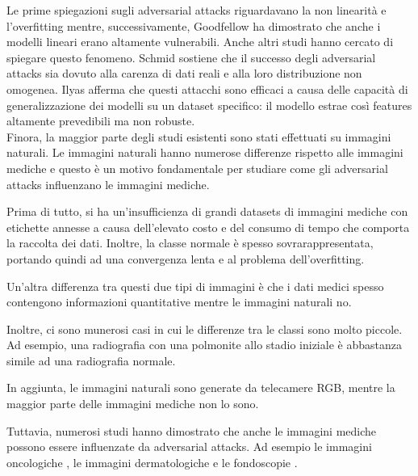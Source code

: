 Le prime spiegazioni sugli adversarial attacks riguardavano la non linearità e l'overfitting mentre, successivamente, Goodfellow %
\cite{goodfellow2014explaining} ha dimostrato che %
anche i modelli lineari erano altamente vulnerabili.
Anche altri studi hanno cercato di spiegare questo fenomeno. Schmid %
\cite{schmidt2018adversarially} sostiene che il successo degli adversarial attacks sia dovuto alla carenza di dati reali e alla loro distribuzione non omogenea. Ilyas %
\cite{ilyas2019adversarial} afferma che questi attacchi sono efficaci a causa delle capacità di generalizzazione dei modelli su un dataset specifico: il modello estrae così features altamente prevedibili ma non robuste.\\

Finora, la maggior parte degli studi esistenti sono stati effettuati su immagini naturali. Le immagini naturali hanno numerose differenze rispetto alle immagini mediche e questo è un motivo fondamentale per studiare come gli adversarial attacks influenzano le immagini mediche.

Prima di tutto, si ha un'insufficienza di grandi datasets di immagini mediche con etichette annesse a causa dell'elevato costo e del consumo di tempo che comporta la raccolta dei dati. Inoltre, la classe normale è spesso sovrarappresentata, portando quindi ad una convergenza lenta e al problema dell'overfitting.

Un'altra differenza tra questi due tipi di immagini è che i dati medici spesso contengono informazioni quantitative mentre le immagini naturali no. 

Inoltre, ci sono munerosi casi in cui le differenze tra le classi sono molto piccole.
Ad esempio, una radiografia con una polmonite allo stadio iniziale è abbastanza simile ad una radiografia normale. 

In aggiunta, le immagini naturali sono generate da telecamere RGB, mentre la maggior parte delle immagini mediche non lo sono. 

Tuttavia, numerosi studi hanno dimostrato che anche le immagini mediche possono essere influenzate da adversarial attacks. %
Ad esempio le immagini oncologiche \cite{joel2021adversarial}, le immagini dermatologiche \cite{allyn2020adversarial} e le fondoscopie \cite{bortsova2021adversarial}.

